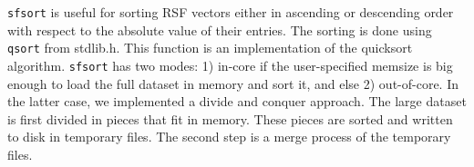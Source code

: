 \noindent
\texttt{sfsort} is useful for sorting RSF vectors either in ascending
or descending order with respect to the absolute value of their
entries. The sorting is done using \texttt{qsort} from stdlib.h. This
function is an implementation of the quicksort algorithm.
\texttt{sfsort} has two modes: 1) in-core if the user-specified
memsize is big enough to load the full dataset in memory and sort it,
and else 2) out-of-core. In the latter case, we implemented a divide
and conquer approach. The large dataset is first divided in pieces
that fit in memory. These pieces are sorted and written to disk in
temporary files. The second step is a merge process of the temporary
files.




